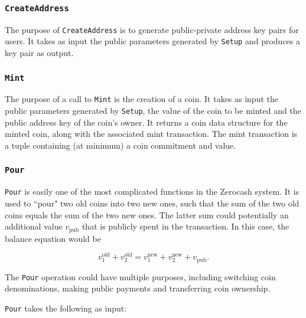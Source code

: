 \documentclass{article}
\begin{document}
\subsubsection{\texttt{CreateAddress}}
The purpose of \texttt{CreateAddress} is to generate public-private address key pairs for users. It takes as input the public parameters generated by \texttt{Setup} and produces a key pair as output.

\subsubsection{\texttt{Mint}}
The purpose of a call to \texttt{Mint} is the creation of a coin. It takes as input the public parameters generated by \texttt{Setup}, the value of the coin to be minted and the public address key of the coin's owner. It returns a coin data structure for the minted coin, along with the associated mint transaction. The mint transaction is a tuple containing (at minimum) a coin commitment and value.

\subsubsection{\texttt{Pour}}
\texttt{Pour} is easily one of the most complicated functions in the Zerocash system. It is used to ``pour" two old coins into two new ones, such that the sum of the two old coins equals the sum of the two new ones. The latter sum could potentially an additional value $v_{\text{pub}}$ that is publicly spent in the transaction. In this case, the balance equation would be 

\begin{equation}
v_1^{\text{old}} + v_2^{\text{old}} = v_1^{\text{new}} + v_2^{\text{new}} + v_{\text{pub}}.
\label{balance}
\end{equation}
\newline

The \texttt{Pour} operation could have multiple purposes, including switching coin denominations, making public payments and transferring coin ownership.

\texttt{Pour} takes the following as input:
\end{document}
